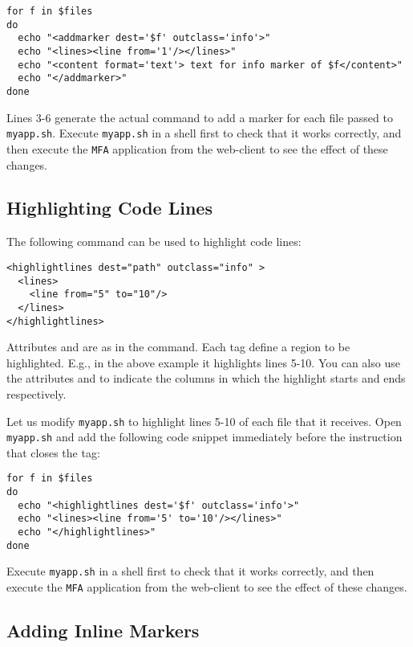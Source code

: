 \medskip
\begin{lstlisting}[style=script]
for f in $files 
do
  echo "<addmarker dest='$f' outclass='info'>"
  echo "<lines><line from='1'/></lines>"
  echo "<content format='text'> text for info marker of $f</content>"
  echo "</addmarker>"
done
\end{lstlisting}

\medskip
\noindent
Lines 3-6 generate the actual command to add a marker for each file
passed to \texttt{myapp.sh}.
%
Execute \texttt{myapp.sh} in a shell first to check that it works
correctly, and then execute the \texttt{MFA} application from the
web-client to see the effect of these changes.

\subsection{Highlighting Code Lines}

The following command can be used to highlight code lines:

\medskip
\begin{lstlisting}
<highlightlines dest="path" outclass="info" > 
  <lines>
    <line from="5" to="10"/>
  </lines>
</highlightlines>
\end{lstlisting}

\medskip
\noindent
Attributes  and  are as in the 
command. Each  tag define a region to be highlighted. E.g.,
in the above example it highlights lines 5-10. You can also use the
attributes  and  to indicate the columns in
which the highlight starts and ends respectively.

Let us modify \texttt{myapp.sh} to highlight lines 5-10 of each file
that it receives. Open \texttt{myapp.sh} and add the following code
snippet immediately before the instruction that closes the
 tag:

\medskip
\begin{lstlisting}[style=script]
for f in $files 
do
  echo "<highlightlines dest='$f' outclass='info'>"
  echo "<lines><line from='5' to='10'/></lines>"
  echo "</highlightlines>"
done
\end{lstlisting}

\medskip
\noindent
Execute \texttt{myapp.sh} in a shell first to check that it works
correctly, and then execute the \texttt{MFA} application from the
web-client to see the effect of these changes.

\subsection{Adding Inline Markers}

